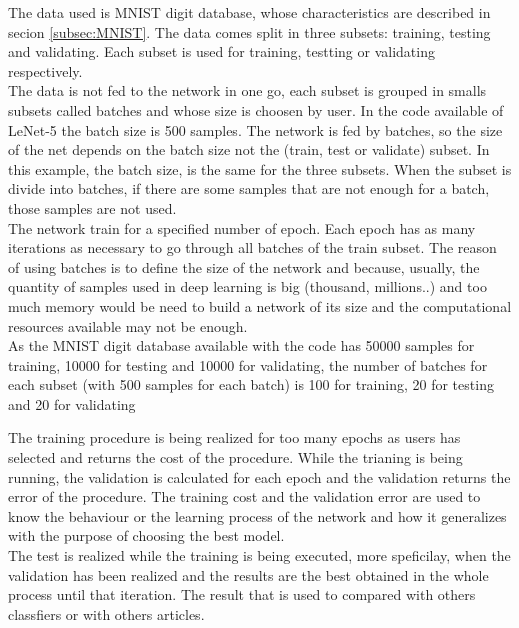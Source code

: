 The data used is MNIST digit database, whose characteristics are described in secion \ref{subsec:MNIST}. The data comes split in three subsets: training, testing and validating. Each subset is used for training, testting or validating respectively.\\

The data is not fed to the network in one go, each subset is grouped in smalls subsets called batches and whose size is choosen by user. In the code available of LeNet-5 the batch size is 500 samples. The network is fed by batches, so the size of the net depends on the batch size not the (train, test or validate) subset. In this example, the batch size, is the same for the three subsets. When the subset is divide into batches, if there are some samples that are not enough for a batch, those samples are not used.\\

The network train for a specified number of epoch. Each epoch has as many iterations as necessary to go through all batches of the train subset. The reason of using batches is to define the size of the network and because, usually, the quantity of samples used in deep learning is big (thousand, millions..) and too much memory would be need to build a network of its size and the computational resources available may not be enough.\\

As the MNIST digit database available with the code has 50000 samples for training, 10000 for testing and 10000 for validating, the number of batches for each subset (with 500 samples for each batch) is 100 for training, 20 for testing and 20 for validating

The training procedure is being realized for too many epochs as users has selected and returns the cost of the procedure. While the trianing is being running, the validation is calculated for each epoch and the validation returns the error of the procedure. The training cost and the validation error are used to know the behaviour or the learning process of the network and how it generalizes with the purpose of choosing the best model.\\

The test is realized while the training is being executed, more speficilay, when the validation has been realized and the results are the best obtained in the whole process until that iteration. The result that is used to compared with others classfiers or with others articles.\\

